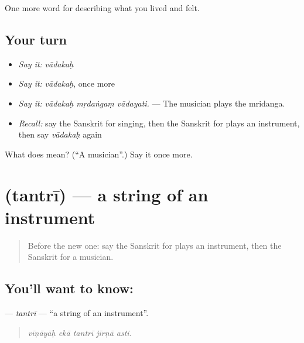\begin{grammarlens}[title={What you've built}]
One more word for describing what you lived and felt.
\end{grammarlens}

\subsection*{Your turn}
\begin{itemize}
\raggedright
  \item \emph{Say it:} \emph{vādakaḥ}
  \item \emph{Say it:} \emph{vādakaḥ}, once more
  \item \emph{Say it:} \emph{vādakaḥ mṛdaṅgaṃ vādayati.} — The musician plays the mridanga.
  \item \emph{Recall:} say the Sanskrit for singing, then the Sanskrit for plays an instrument, then say \emph{vādakaḥ} again
\end{itemize}

\begin{tcolorbox}[breakable,colback=teal!4,colframe=teal!35!black,title={Before you move on}]
What does  mean? (\textquotedblleft{}A musician\textquotedblright{}.) Say it once more.
\end{tcolorbox}
\section[\texorpdfstring{\sk{तन्त्री} (tantrī)}{तन्त्री (tantrī)}]{ (tantrī) — a string of an instrument}

\label{lesson:SA-C521-tantri}



\begin{quote}
Before the new one: say the Sanskrit for plays an instrument, then the Sanskrit for a musician.
\end{quote}

\subsection*{You'll want to know: }
\textbf{} — \emph{tantrī} — \textquotedblleft{}a string of an instrument\textquotedblright{}.

\begin{quote}
    
\end{quote}

\begin{quote}
\emph{vīṇāyāḥ ekā tantrī jīrṇā asti.}
\end{quote}

